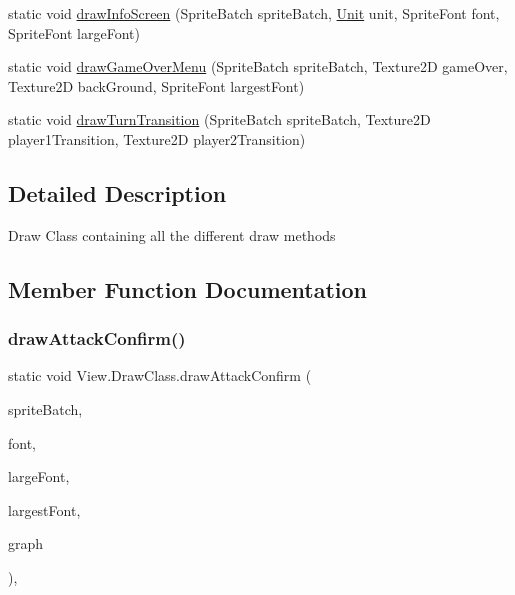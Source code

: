 \begin{DoxyCompactItemize}
\item 
static void \hyperlink{class_view_1_1_draw_class_a02cb24dbfed917cc4f9eb2bc9309664e}{draw\+Info\+Screen} (Sprite\+Batch sprite\+Batch, \hyperlink{interface_model_1_1_unit_module_1_1_unit}{Unit} unit, Sprite\+Font font, Sprite\+Font large\+Font)
\item 
static void \hyperlink{class_view_1_1_draw_class_a58026b4efa17fe7b88500b5d58009e41}{draw\+Game\+Over\+Menu} (Sprite\+Batch sprite\+Batch, Texture2D game\+Over, Texture2D back\+Ground, Sprite\+Font largest\+Font)
\item 
static void \hyperlink{class_view_1_1_draw_class_a93919267e711f68a3ebc1087246fbcbe}{draw\+Turn\+Transition} (Sprite\+Batch sprite\+Batch, Texture2D player1\+Transition, Texture2D player2\+Transition)
\end{DoxyCompactItemize}


\subsection{Detailed Description}
Draw Class containing all the different draw methods 



\subsection{Member Function Documentation}
\hypertarget{class_view_1_1_draw_class_a92a20fce6da929b25cd19c68f37cee03}{}\label{class_view_1_1_draw_class_a92a20fce6da929b25cd19c68f37cee03} 
\subsubsection{\texorpdfstring{draw\+Attack\+Confirm()}{drawAttackConfirm()}}
{\footnotesize\ttfamily static void View.\+Draw\+Class.\+draw\+Attack\+Confirm (\begin{DoxyParamCaption}\item[{Sprite\+Batch}]{sprite\+Batch,  }\item[{Sprite\+Font}]{font,  }\item[{Sprite\+Font}]{large\+Font,  }\item[{Sprite\+Font}]{largest\+Font,  }\item[{\hyperlink{class_model_1_1_map_module_1_1_graph}{Graph}}]{graph }\end{DoxyParamCaption})\hspace{0.3cm}{\ttfamily [inline]}, {\ttfamily [static]}}

